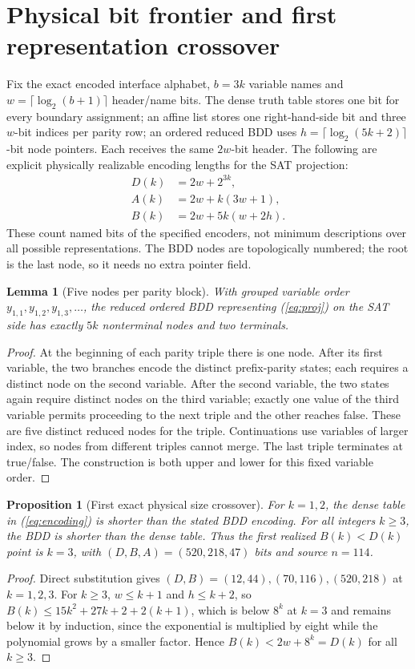 \documentclass[10pt]{article}
\newtheorem{lemma}[theorem]{Lemma}
\newtheorem{proposition}[theorem]{Proposition}
\begin{document}
\section{Physical bit frontier and first representation crossover}
\noindent Fix the exact encoded interface alphabet, $b=3k$ variable names and $w=\lceil\log_2(b+1)\rceil$ header/name bits. The dense truth table stores one bit for every boundary assignment; an affine list stores one right-hand-side bit and three $w$-bit indices per parity row; an ordered reduced BDD uses $h=\lceil\log_2(5k+2)\rceil$-bit node pointers. Each receives the same $2w$-bit header. The following are explicit physically realizable encoding lengths for the SAT projection:
\begin{align}\label{eq:encoding}
 D(k)&=2w+2^{3k},\\
 A(k)&=2w+k(3w+1),\\
 B(k)&=2w+5k(w+2h).
\end{align}
These count named bits of the specified encoders, not minimum descriptions over all possible representations. The BDD nodes are topologically numbered; the root is the last node, so it needs no extra pointer field.
\begin{lemma}[Five nodes per parity block]\label{lem:bdd}
With grouped variable order $y_{1,1},y_{1,2},y_{1,3},\ldots$, the reduced ordered BDD representing (\ref{eq:proj}) on the SAT side has \emph{exactly} $5k$ nonterminal nodes and two terminals.
\end{lemma}
\begin{proof}
At the beginning of each parity triple there is one node. After its first variable, the two branches encode the distinct prefix-parity states; each requires a distinct node on the second variable. After the second variable, the two states again require distinct nodes on the third variable; exactly one value of the third variable permits proceeding to the next triple and the other reaches false. These are five distinct reduced nodes for the triple. Continuations use variables of larger index, so nodes from different triples cannot merge. The last triple terminates at true/false. The construction is both upper and lower for this fixed variable order.
\end{proof}

\begin{proposition}[First exact physical size crossover]\label{prop:cross}
For $k=1,2$, the dense table in (\ref{eq:encoding}) is shorter than the stated BDD encoding. For all integers $k\ge3$, the BDD is shorter than the dense table. Thus the first realized $B(k)<D(k)$ point is \(k=3\), with $(D,B,A)=(520,218,47)$ bits and source $n=114$.
\end{proposition}
\begin{proof}
Direct substitution gives $(D,B)=(12,44),(70,116),(520,218)$ at $k=1,2,3$. For $k\ge3$, $w\le k+1$ and $h\le k+2$, so $B(k)\le 15k^2+27k+2+2(k+1)$, which is below $8^k$ at $k=3$ and remains below it by induction, since the exponential is multiplied by eight while the polynomial grows by a smaller factor. Hence $B(k)<2w+8^k=D(k)$ for all $k\ge3$.
\end{proof}
\end{document}

